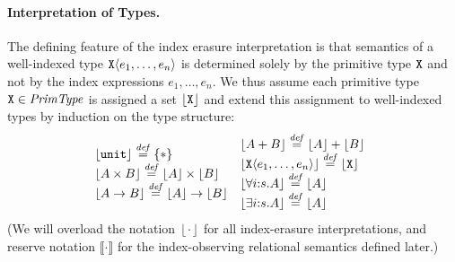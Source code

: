 \documentclass{sigplanconf}
\newcommand{\PrimTypeSet}{\mathit{PrimType}}
\newcommand{\tyUnit}{\texttt{unit}}
\newcommand{\tyPrim}[2]{\textup{\texttt{#1}}\langle #2 \rangle}
\newcommand{\tyPrimNm}[1]{\textup{\texttt{#1}}}
\newcommand{\tyArr}{\to}
\newcommand{\tyProduct}{\times}
\newcommand{\tySem}[1]{\left\lfloor #1 \right\rfloor}
\newcommand{\tmSem}[1]{\left\lfloor{#1}\right\rfloor}
\newcommand{\tyPrimSem}[1]{\left\lfloor #1 \right\rfloor}
\newcommand{\isDefinedAs}{\stackrel{\mathit{def}}=}
\theoremstyle{examplestyle}
\theoremstyle{restatementstyle}
\begin{document}

\paragraph{Interpretation of Types.}

The defining feature of the index erasure interpretation is that 
semantics of a well-indexed type $\tyPrim{X}{e_1,\ldots,e_n}$ is
determined solely by the primitive type $\tyPrimNm{X}$ and not by the
index expressions $e_1,\ldots,e_n$. %
We thus assume each
primitive type $\tyPrimNm{X} \in \PrimTypeSet$ is assigned a set
$\tyPrimSem{\tyPrimNm{X}}$ and %
extend this assignment to %
well-indexed types by induction on the type structure:
\begin{displaymath}
  \begin{array}{@{}c@{\hspace{0em}}c@{}}
    \begin{array}{@{}l}
      \tySem{\tyUnit} \isDefinedAs \{*\} \\
      \tySem{A \tyProduct B} \isDefinedAs \tySem{A} \times \tySem{B} \\
      \tySem{A \tyArr B} \isDefinedAs \tySem{A} \to \tySem{B} \\
    \end{array}
    &
    \begin{array}{l}
      \tySem{A + B} \isDefinedAs \tySem{A} + \tySem{B} \\
      \tySem{\tyPrim{X}{e_1,\ldots,e_n}} \isDefinedAs \tyPrimSem{\tyPrimNm{X}} \\
      \tySem{\forall i\mathord:s. A} \isDefinedAs \tySem{A} \\
      \tySem{\exists i\mathord:s. A} \isDefinedAs \tySem{A}
    \end{array}
  \end{array}
\end{displaymath}
(We will overload the
notation $\tmSem\cdot$ for all index-erasure interpretations, 
and reserve notation $\llbracket\cdot\rrbracket$ for the
index-observing relational semantics defined later.)
\end{document}
